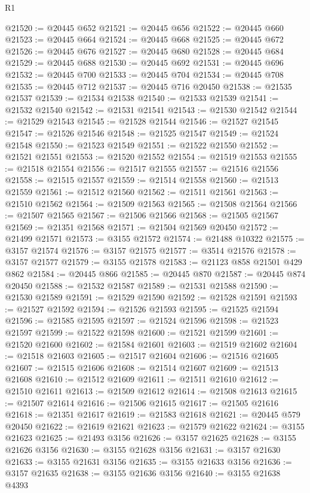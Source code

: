 \begin{lexlean}{R1}
\begin{coremodule}
@21520 := @20445 @652
@21521 := @20445 @656
@21522 := @20445 @660
@21523 := @20445 @664
@21524 := @20445 @668
@21525 := @20445 @672
@21526 := @20445 @676
@21527 := @20445 @680
@21528 := @20445 @684
@21529 := @20445 @688
@21530 := @20445 @692
@21531 := @20445 @696
@21532 := @20445 @700
@21533 := @20445 @704
@21534 := @20445 @708
@21535 := @20445 @712
@21537 := @20445 @716 @20450
@21538 := @21535 @21537
@21539 := @21534 @21538
@21540 := @21533 @21539
@21541 := @21532 @21540
@21542 := @21531 @21541
@21543 := @21530 @21542
@21544 := @21529 @21543
@21545 := @21528 @21544
@21546 := @21527 @21545
@21547 := @21526 @21546
@21548 := @21525 @21547
@21549 := @21524 @21548
@21550 := @21523 @21549
@21551 := @21522 @21550
@21552 := @21521 @21551
@21553 := @21520 @21552
@21554 := @21519 @21553
@21555 := @21518 @21554
@21556 := @21517 @21555
@21557 := @21516 @21556
@21558 := @21515 @21557
@21559 := @21514 @21558
@21560 := @21513 @21559
@21561 := @21512 @21560
@21562 := @21511 @21561
@21563 := @21510 @21562
@21564 := @21509 @21563
@21565 := @21508 @21564
@21566 := @21507 @21565
@21567 := @21506 @21566
@21568 := @21505 @21567
@21569 := @21351 @21568
@21571 := @21504 @21569 @20450
@21572 := @21499 @21571
@21573 := @3155 @21572
@21574 := @21488 @10322
@21575 := @3157 @21574
@21576 := @3157 @21575
@21577 := @3514 @21576
@21578 := @3157 @21577
@21579 := @3155 @21578
@21583 := @21123 @858 @21501 @429 @862
@21584 := @20445 @866
@21585 := @20445 @870
@21587 := @20445 @874 @20450
@21588 := @21532 @21587
@21589 := @21531 @21588
@21590 := @21530 @21589
@21591 := @21529 @21590
@21592 := @21528 @21591
@21593 := @21527 @21592
@21594 := @21526 @21593
@21595 := @21525 @21594
@21596 := @21585 @21595
@21597 := @21524 @21596
@21598 := @21523 @21597
@21599 := @21522 @21598
@21600 := @21521 @21599
@21601 := @21520 @21600
@21602 := @21584 @21601
@21603 := @21519 @21602
@21604 := @21518 @21603
@21605 := @21517 @21604
@21606 := @21516 @21605
@21607 := @21515 @21606
@21608 := @21514 @21607
@21609 := @21513 @21608
@21610 := @21512 @21609
@21611 := @21511 @21610
@21612 := @21510 @21611
@21613 := @21509 @21612
@21614 := @21508 @21613
@21615 := @21507 @21614
@21616 := @21506 @21615
@21617 := @21505 @21616
@21618 := @21351 @21617
@21619 := @21583 @21618
@21621 := @20445 @579 @20450
@21622 := @21619 @21621
@21623 := @21579 @21622
@21624 := @3155 @21623
@21625 := @21493 @3156
@21626 := @3157 @21625
@21628 := @3155 @21626 @3156
@21630 := @3155 @21628 @3156
@21631 := @3157 @21630
@21633 := @3155 @21631 @3156
@21635 := @3155 @21633 @3156
@21636 := @3157 @21635
@21638 := @3155 @21636 @3156
@21640 := @3155 @21638 @4393

\end{coremodule}
\end{lexlean}
